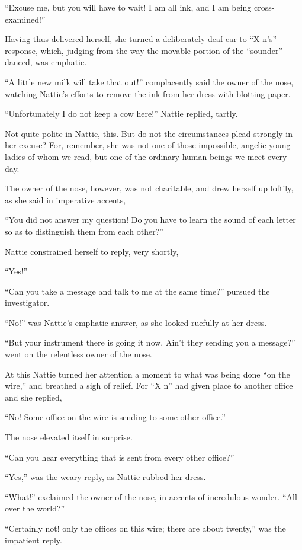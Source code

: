 ``Excuse me, but you will have to wait! I am all ink, and I am being
cross-examined!''

Having thus delivered herself, she turned a deliberately deaf ear to ``X
n's'' response, which, judging from the way the movable portion of the
``sounder'' danced, was emphatic.

``A little new milk will take that out!'' complacently said the owner of
the nose, watching Nattie's efforts to remove the ink from her dress
with blotting-paper.

``Unfortunately I do not keep a cow here!'' Nattie replied, tartly.

Not quite polite in Nattie, this. But do not the circumstances plead
strongly in her excuse? For, remember, she was not one of those
impossible, angelic young ladies of whom we read, but one of the
ordinary human beings we meet every day.

The owner of the nose, however, was not charitable, and drew herself up
loftily, as she said in imperative accents,

``You did not answer my question! Do you have to learn the sound of each
letter so as to distinguish them from each other?''

Nattie constrained herself to reply, very shortly,

``Yes!''

``Can you take a message and talk to me at the same time?'' pursued the
investigator.

``No!'' was Nattie's emphatic answer, as she looked ruefully at her dress.

``But your instrument there is going it now. Ain't they sending you a
message?'' went on the relentless owner of the nose.

At this Nattie turned her attention a moment to what was being done ``on
the wire,'' and breathed a sigh of relief. For ``X n'' had given place to
another office and she replied,

``No! Some office on the wire is sending to some other office.''

The nose elevated itself in surprise.

``Can you hear everything that is sent from every other office?''

``Yes,'' was the weary reply, as Nattie rubbed her dress.

``What!'' exclaimed the owner of the nose, in accents of incredulous
wonder. ``All over the world?''

``Certainly not! only the offices on this wire; there are about twenty,''
was the impatient reply.

